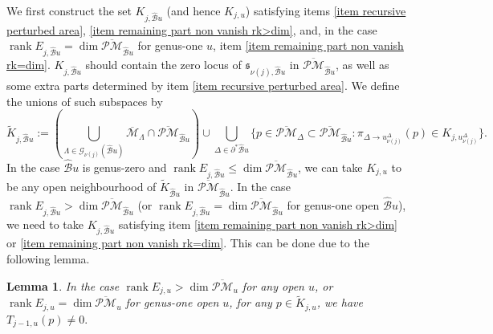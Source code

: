 \documentclass[11pt]{amsart}
\newtheorem{lem}[dummy]{Lemma}
\theoremstyle{definition}
\theoremstyle{remark}
\newcommand{\oPMb}{{\overline{\mathcal{PM}}}}
\newcommand{\<}{\left<}
\renewcommand{\>}{\right>}
\numberwithin{equation}{section}
\DeclareMathOperator{\rk}{rank}
\def\Mbar{{\overline{\mathcal M}}}
\begin{document}
    We first construct the set $K_{j,\hat{\mathcal B}u}$ (and hence $K_{j,u}$) satisfying items \ref{item recursive perturbed area}, \ref{item remaining part non vanish rk>dim}, and, in the case $\rk E_{j,{\hat{\mathcal B}u}}=\dim \oPMb_{\hat{\mathcal B}u}$ for genus-one $u$, item \ref{item remaining part non vanish rk=dim}.  $K_{j,\hat{\mathcal B}u}$ should contain the zero locus of $\mathfrak {s}_{\nu(j),\hat{\mathcal B}u}$ in $\oPMb_{\hat{\mathcal B}u}$, as well as some extra parts determined by item \ref{item recursive perturbed area}. We define the unions of such subspaces %
by
    $$\tilde{K}_{j,\hat{\mathcal B}u}:=\left( \bigcup_{\Lambda\in \mathcal G_{\nu(j)}({\hat{\mathcal B}u})}\Mbar_\Lambda\cap \oPMb_{\hat{\mathcal B}u}\right)\cup \bigcup_{\Delta \in \partial^* {\hat{\mathcal B}u}}\{p\in \oPMb_\Delta\subset \oPMb_{\hat{\mathcal B}u} \colon \pi_{\Delta \to u^{\Delta}_{\nu(j)}}(p)\in K_{j,u^{\Delta}_{\nu(j)}}\}.$$
    In %
the case ${\hat{\mathcal B}u}$ is genus-zero and $\rk E_{j,{\hat{\mathcal B}u}}\le \dim \oPMb_{\hat{\mathcal B}u}$, we can take $K_{j,u}$ to be any open neighbourhood of $\tilde{K}_{\hat{\mathcal B}u}$ in $\oPMb_{\hat{\mathcal B}u}$. In the case $\rk E_{j,{\hat{\mathcal B}u}}> \dim \oPMb_{\hat{\mathcal B}u}$ (or $\rk E_{j,{\hat{\mathcal B}u}}= \dim \oPMb_{\hat{\mathcal B}u}$ for genus-one open ${\hat{\mathcal B}u}$), we need to take $K_{j,\hat{\mathcal B}u}$ satisfying item \ref{item remaining part non vanish rk>dim} or \ref{item remaining part non vanish rk=dim}. This can be done due to the following lemma. 
    \begin{lem}
        In the case $\rk E_{j,u}> \dim \oPMb_u$ for any open $u$, or $\rk E_{j,u}= \dim \oPMb_u$ for genus-one open $u$, for any $p\in \tilde{K}_{j,u}$, we have 
        $T_{j-1,u}(p) \ne 0.$
    \end{lem}
\end{document}
